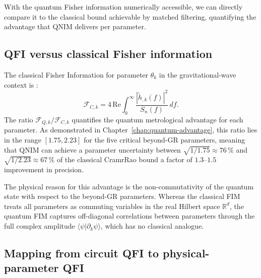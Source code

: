 \documentclass[11pt,a4paper, english]{book}
\theoremstyle{plain}
\theoremstyle{definition}
\numberwithin{equation}{chapter}
\numberwithin{figure}{chapter}
\numberwithin{table}{chapter}
\begin{document}
With the quantum Fisher information numerically accessible, we can directly compare
it to the classical bound achievable by matched filtering, quantifying the advantage
that QNIM delivers per parameter.

\subsection{QFI versus classical Fisher information}
\label{subsec:qfi_vs_cfi}

The classical Fisher Information for parameter $\theta_k$ in the
gravitational-wave context is \cite{Veitch_2015}:
\begin{equation}
  \label{eq:cfi_gw}
  \mathcal{F}_{C,k} = 4\,\mathrm{Re}
    \int_0^\infty \frac{|\tilde{h}_{,k}(f)|^2}{S_n(f)}\,df.
\end{equation}
The ratio $\mathcal{F}_{Q,k}/\mathcal{F}_{C,k}$ quantifies the quantum
metrological advantage for each parameter.  As demonstrated in
Chapter~\ref{chap:quantum-advantage}, this ratio lies in the range
$[1.75, 2.23]$ for the five critical beyond-GR parameters, meaning
that QNIM can achieve a parameter uncertainty between $\sqrt{1/1.75}
\approx 76\,\%$ and $\sqrt{1/2.23} \approx 67\,\%$ of the classical
CramrRao bound  a factor of $1.3$--$1.5$ improvement in precision.

The physical reason for this advantage is the non-commutativity of
the quantum state with respect to the beyond-GR parameters.  Whereas
the classical FIM treats all parameters as commuting variables in the
real Hilbert space $\mathbb{R}^d$, the quantum FIM captures off-diagonal
correlations between parameters through the full complex amplitude
$\langle\psi|\partial_k\psi\rangle$, which has no classical analogue.

\subsection{Mapping from circuit QFI to physical-parameter QFI}
\label{subsec:qfi_chain_rule}
\end{document}
